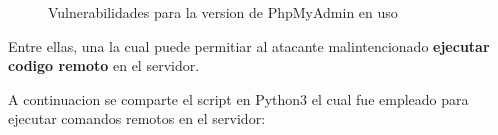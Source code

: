 \documentclass[a4paper]{article} %
\begin{document}
  \begin{figure}[h]

    \centering
    \setlength{\fboxrule}{0.8pt}
      \caption{Vulnerabilidades para la version de PhpMyAdmin en uso}
  \end{figure}

  \vspace{0.3cm}
  Entre ellas, una la cual puede permitiar al atacante malintencionado \textbf{ejecutar codigo remoto} en el servidor.
  \clearpage

  A continuacion se comparte el script en Python3 el cual fue empleado para ejecutar comandos remotos en el servidor:

  \vspace{0.3cm}
\end{document}
